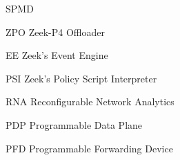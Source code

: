 
\begin{listofabbrv}{SPMD}
    \item[ZPO] Zeek-P4 Offloader
    \item[EE]  Zeek's Event Engine
    \item[PSI] Zeek's Policy Script Interpreter
    \item[RNA] Reconfigurable Network Analytics
    \item[PDP] Programmable Data Plane
    \item[PFD] Programmable Forwarding Device
\end{listofabbrv}
